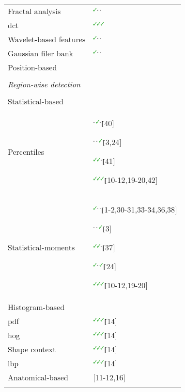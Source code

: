 \begin{table*}
\begin{threeparttable}
\begin{tabular}{p{.6\linewidth} p{.3\linewidth}}
		\quad \quad \quad Fractal analysis & $^{\text{{\cmarksmall}- -}}$\cite{Lopes2011,Lv2009} \\
		\quad \quad \quad \Ac{dct} & $^{\text{{\cmarksmall}{\cmarksmall}{\cmarksmall}}}$\cite{Niaf2011,Niaf2012} \\
		\quad \quad \quad Wavelet-based features & $^{\text{{\cmarksmall}- -}}$\cite{Viswanath2012} \\
		\quad \quad \quad Gaussian filer bank & $^{\text{{\cmarksmall}- -}}$\cite{Litjens2014} \\ 
		\quad \quad Position-based & \cite{Chan2003,Litjens2011,Litjens2012,Litjens2014} \\ \\ [-1.5ex]
		\quad \textit{Region-wise detection} &  \\ \\ [-1.5ex]
		\quad \quad Statistical-based & \\
		\quad \quad \quad Percentiles & $^{\text{- {\cmarksmall}-}}[$40$]$ \par $^{\text{- - {\cmarksmall}}}[$3,24$]$\par $^{\text{{\cmarksmall}{\cmarksmall}-}}[$41$]$\par $^{\text{{\cmarksmall}{\cmarksmall}{\cmarksmall}}}[$10-12,19-20,42$]$ \\
		\quad \quad \quad Statistical-moments & $^{\text{{\cmarksmall}- -}}[$1-2,30-31,33-34,36,38$]$\par $^{\text{- - {\cmarksmall}}}[$3$]$\par $^{\text{{\cmarksmall}{\cmarksmall}-}}[$37$]$\par $^{\text{{\cmarksmall}- {\cmarksmall}}}[$24$]$\par $^{\text{{\cmarksmall}{\cmarksmall}{\cmarksmall}}}[$10-12,19-20$]$ \\
		\quad \quad Histogram-based & \\
		\quad \quad \quad \acs{pdf} & $^{\text{{\cmarksmall}{\cmarksmall}{\cmarksmall}}}[$14$]$ \\
		\quad \quad \quad \acs{hog} & $^{\text{{\cmarksmall}{\cmarksmall}{\cmarksmall}}}[$14$]$ \\
		\quad \quad \quad Shape context & $^{\text{{\cmarksmall}{\cmarksmall}{\cmarksmall}}}[$14$]$ \\
		\quad \quad \quad \acs{lbp} & $^{\text{{\cmarksmall}{\cmarksmall}{\cmarksmall}}}[$14$]$ \\
		\quad \quad Anatomical-based & $[$11-12,16$]$ \\ \\ [-1.5ex]

\end{tabular}
\end{threeparttable}
\end{table*}
